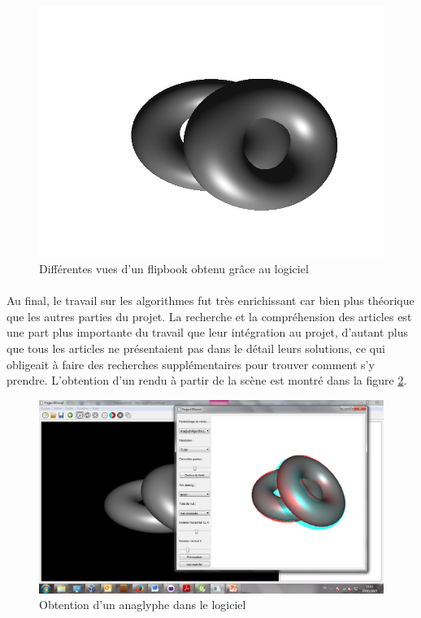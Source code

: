 \begin{figure}[h]
        \includegraphics[scale=0.3]{testGif8.png}
	\caption{\label{fig:flipbook_logiciel} Différentes vues d'un flipbook obtenu grâce au logiciel \protect}
\end{figure}

\paragraph{}
Au final, le travail sur les algorithmes fut très enrichissant car bien plus théorique que les autres parties du projet. La recherche et la compréhension des articles est une part plus importante du travail que leur intégration au projet, d'autant plus que tous les articles ne présentaient pas dans le détail leurs solutions, ce qui obligeait à faire des recherches supplémentaires pour trouver comment s'y prendre. L'obtention d'un rendu à partir de la scène est montré dans la figure \ref{fig:screenRendu}.

\begin{figure}[h]
	\centering
	\includegraphics[scale=0.4]{rendu.png}
	\caption{\label{fig:screenRendu} Obtention d'un anaglyphe dans le logiciel \protect}
\end{figure}


